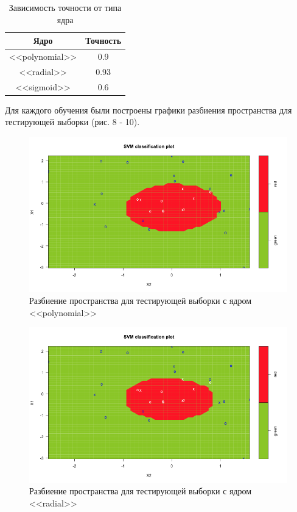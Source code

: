 \documentclass[]{article}
\numberwithin{equation}{section}
\begin{document}
        \begin{table}[H]
            \centering
            \begin{tabular}{|c|c|}
                \hline
                \textbf{Ядро}  & \textbf{Точность} \\
                \hline
                <<polynomial>> & 0.9 \\
                \hline
                <<radial>> & 0.93 \\
                \hline
                <<sigmoid>> & 0.6 \\
                \hline
            \end{tabular}
            \caption{Зависимость точности от типа ядра}
        \end{table}

        Для каждого обучения были построены графики разбиения пространства для тестирующей выборки (рис. 8 - 10).

        \begin{figure}[H]
            \centering
            \includegraphics[width = 0.9\linewidth]{data/data3_poly.png}
            \caption{Разбиение пространства для тестирующей выборки с ядром <<polynomial>>}
        \end{figure}

        \begin{figure}[H]
            \centering
            \includegraphics[width = 0.9\linewidth]{data/data3_radial.png}
            \caption{Разбиение пространства для тестирующей выборки с ядром <<radial>>}
        \end{figure}
\end{document}
